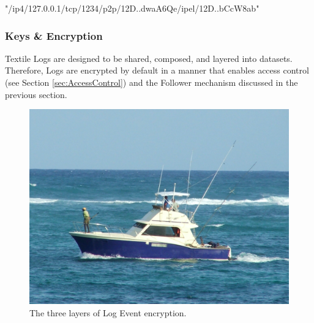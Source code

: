 \documentclass{comjnl}
\begin{document}
\begin{strip}
\begin{tcolorbox}[title=Log IPEL Multiaddress]
"/ip4/127.0.0.1/tcp/1234/p2p/12D..dwaA6Qe/ipel/12D..bCcW8ab"
\end{tcolorbox}
\end{strip}

\begin{strip}
\begin{tcolorbox}
\end{tcolorbox}
\end{strip}

\subsubsection{Keys \& Encryption} \label{sec:KeysEncryption}

Textile Logs are designed to be shared, composed, and layered into datasets. Therefore, Logs are encrypted by default in a manner that enables access control (see Section  \ref{sec:AccessControl}) and the Follower mechanism discussed in the previous section.

\begin{figure}
  \includegraphics[width=\linewidth]{boat.jpg}
  \caption{The three layers of Log Event encryption.}
  \label{fig:boat1}
\end{figure}
\end{document}
